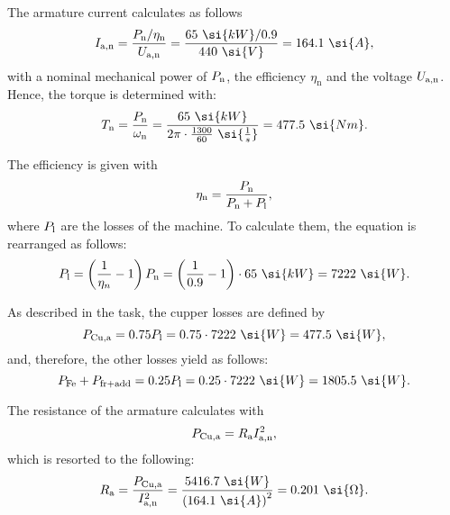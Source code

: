 \begin{solutionblock}
    The armature current calculates as follows
    \begin{equation}
        I_{\mathrm{a,n}} = \frac{\Pn / \eta_{\mathrm{n}}}{\Uan}
        = \frac{65 \ \si{kW} / 0.9}{440 \ \si{V}}
        = 164.1 \ \si{A},
    \end{equation}
    with a nominal mechanical power of $P_{\mathrm{n}}$, the efficiency $\eta_{\mathrm{n}}$ and the voltage $U_{\mathrm{a,n}}$.
    Hence, the torque is determined with:
    \begin{equation}
        \Tn = \frac{\Pn}{\omega_{\mathrm{n}}} 
        = \frac{65 \ \si{kW}}{2 \pi \cdot \frac{1300}{60} \ \si{\frac{1}{s}}}
        = 477.5 \ \si{Nm}.
    \end{equation}

    The efficiency is given with
    \begin{equation}
        \eta_{\mathrm{n}} = \frac{P_{\mathrm{n}}}{P_{\mathrm{n}} + P_{\mathrm{l}}},
    \end{equation}
    where $P_{\mathrm{l}}$ are the losses of the machine. To calculate them, the equation is rearranged as follows:
    \begin{equation}
        \Pl = \left(\frac{1}{\eta_{n}} - 1 \right) \Pn
        = \left(\frac{1}{0.9}-1 \right) \cdot 65\ \si{kW}
        = 7222 \ \si{W}.
    \end{equation}

    As described in the task, the cupper losses are defined by
    \begin{equation}
        P_{\mathrm{Cu,a}} = 0.75 \Pl
        = 0.75 \cdot 7222 \ \si{W} 
        = 477.5 \ \si{W},
    \end{equation}
    and, therefore, the other losses yield as follows:
    \begin{equation}
        P_{\mathrm{Fe}} + P_{\mathrm{fr + add}} = 0.25 \Pl 
        = 0.25 \cdot 7222 \ \si{W}
        = 1805.5 \ \si{W}.
    \end{equation}

    The resistance of the armature calculates with
    \begin{equation}
        P_{\mathrm{Cu,a}} = R_{\mathrm{a}} I_{\mathrm{a,n}}^{2},
    \end{equation}
    which is resorted to the following:
    \begin{equation}
        \Ra = \frac{P_{\mathrm{Cu,a}}}{I_{\mathrm{a,n}}^{2}}
        = \frac{5416.7 \ \si{W}}{\left(164.1 \ \si{A}\right)^2}
        = 0.201 \ \si{\Omega}.
    \end{equation}


\end{solutionblock}
